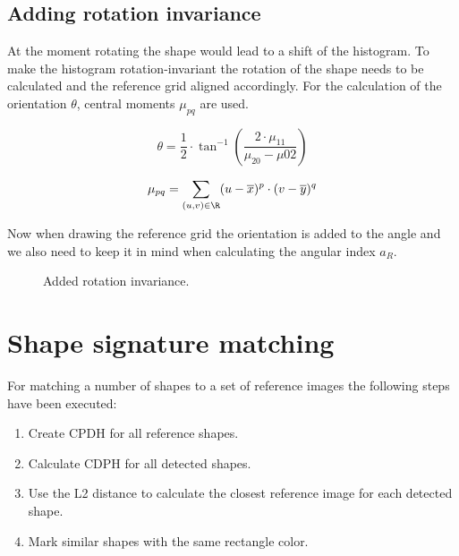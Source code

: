 \subsection{Adding rotation invariance}
At the moment rotating the shape would lead to a shift of the histogram. To make the histogram rotation-invariant the rotation of the shape needs to be calculated and the reference grid aligned accordingly. For the calculation of the orientation $\theta$, central moments $\mu_{pq}$ are used.

\begin{equation}
	\theta = \frac{1}{2} \cdot \tan^{-1}\left(\frac{2 \cdot \mu_{11}}{\mu_{20} - \mu{02}}\right)
\end{equation}

\begin{equation}
	\mu_{pq} = \sum_{(u,v) \in \R} (u-\overline{x})^p \cdot (v - \overline{y})^q
\end{equation}

Now when drawing the reference grid the orientation is added to the angle and we also need to keep it in mind when calculating the angular index $a_R$.

\begin{figure}
	\centering
	\caption{Added rotation invariance.}
	\label{fig:Result5_6}
\end{figure}

\section{Shape signature matching}
For matching a number of shapes to a set of reference images the following steps have been executed:
\begin{enumerate}
	\item Create CPDH for all reference shapes.
	\item Calculate CDPH for all detected shapes.
	\item Use the L2 distance to calculate the closest reference image for each detected shape.
	\item Mark similar shapes with the same rectangle color.
\end{enumerate}

